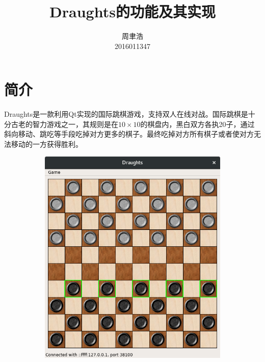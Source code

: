 \documentclass[11pt,a4paper]{article}
\title{Draughts的功能及其实现}
\author{周聿浩\\ \small{2016011347}}
\begin{document}
\maketitle
\section{简介}
Draughts是一款利用Qt实现的国际跳棋游戏，支持双人在线对战。国际跳棋是十分古老的智力游戏之一，其规则是在$10 \times 10$的棋盘内，黑白双方各执20子，通过斜向移动、跳吃等手段吃掉对方更多的棋子。最终吃掉对方所有棋子或者使对方无法移动的一方获得胜利。

\begin{figure}[H]
	\centering
	\begin{subfigure}{.24\textwidth}
		\centering
		\includegraphics[width=\linewidth]{img1.png}
		\caption{}
	\end{subfigure}
	\hfill
	\begin{subfigure}{.24\textwidth}
		\centering

\end{subfigure}
\end{figure}
\end{document}
